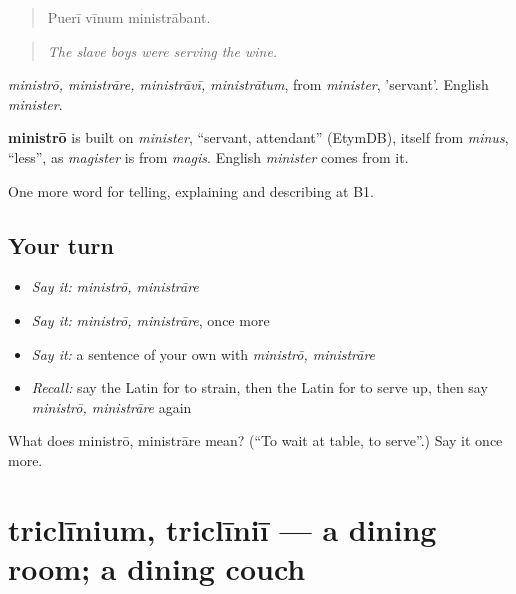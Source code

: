 \begin{quote}
Puerī vīnum ministrābant.
\end{quote}

\begin{quote}
\emph{The slave boys were serving the wine.}
\end{quote}

\emph{ministrō, ministrāre, ministrāvī, ministrātum}, from \emph{minister}, 'servant'. English \emph{minister}.

\begin{cousinweb}
\textbf{ministrō} is built on \emph{minister}, \textquotedblleft{}servant, attendant\textquotedblright{} (EtymDB), itself from \emph{minus}, \textquotedblleft{}less\textquotedblright{}, as \emph{magister} is from \emph{magis}. English \emph{minister} comes from it.
\end{cousinweb}

\begin{grammarlens}[title={What you've built}]
One more word for telling, explaining and describing at B1.
\end{grammarlens}

\subsection*{Your turn}
\begin{itemize}
\raggedright
  \item \emph{Say it:} \emph{ministrō, ministrāre}
  \item \emph{Say it:} \emph{ministrō, ministrāre}, once more
  \item \emph{Say it:} a sentence of your own with \emph{ministrō, ministrāre}
  \item \emph{Recall:} say the Latin for to strain, then the Latin for to serve up, then say \emph{ministrō, ministrāre} again
\end{itemize}

\begin{tcolorbox}[breakable,colback=teal!4,colframe=teal!35!black,title={Before you move on}]
What does ministrō, ministrāre mean? (\textquotedblleft{}To wait at table, to serve\textquotedblright{}.) Say it once more.
\end{tcolorbox}
\section[triclīnium, triclīniī]{triclīnium, triclīniī — a dining room; a dining couch}

